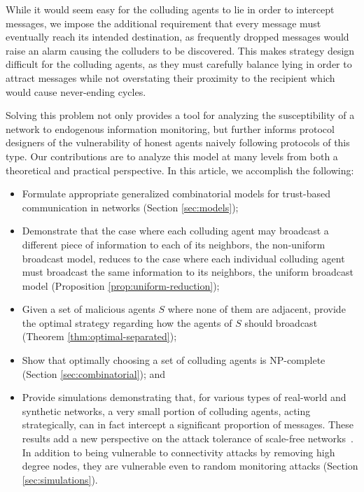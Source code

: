\documentclass[reprint]{revtex4-1}
\begin{document}
While it would seem easy for the colluding agents to lie in order to intercept messages, we impose the additional requirement that every message must eventually reach its intended destination, as frequently dropped messages would raise an alarm causing the colluders to be discovered. This makes strategy design difficult for the colluding agents, as they must carefully balance lying in order to attract messages while not overstating their proximity to the recipient which would cause never-ending cycles. 

Solving this problem not only provides a tool for analyzing the susceptibility of a network to endogenous information monitoring, but further informs protocol designers of the vulnerability of honest agents naively following protocols of this type. Our contributions are to analyze this model at many levels from both a theoretical and practical perspective. In this article, we accomplish the following:
\begin{itemize}
\item Formulate appropriate generalized combinatorial models for trust-based communication in networks (Section \ref{sec:models});
\item Demonstrate that the case where each colluding agent may broadcast a different piece of information to each of its neighbors, the non-uniform broadcast model, reduces to the case where each individual colluding agent must broadcast the same information to its neighbors, the uniform broadcast model (Proposition \ref{prop:uniform-reduction});
\item Given a set of malicious agents $S$ where none of them are adjacent, provide the optimal strategy regarding how the agents of $S$ should broadcast (Theorem \ref{thm:optimal-separated});
\item Show that optimally choosing a set of colluding agents is NP-complete (Section \ref{sec:combinatorial}); and 
\item Provide simulations demonstrating that, for various types of real-world and synthetic networks, a very small portion of colluding agents, acting strategically,  can in fact intercept a significant proportion of messages. These results add a new perspective on the attack tolerance of scale-free networks~\cite{AlbertJB00}. In addition to being vulnerable to connectivity attacks by removing high degree nodes, they are vulnerable even to random monitoring attacks (Section \ref{sec:simulations}).
\end{itemize} 
\end{document}
